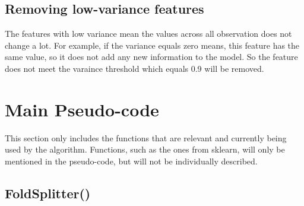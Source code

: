 \documentclass{article}
\begin{document}
\subsection{Removing low-variance features}
The features with low variance mean the values across all observation does not change a lot. For example, if the variance equals zero means, this feature has the same value, so it does not add any new information to the model.  So the feature does not meet the varaince threshold which equals 0.9    will be removed.

 \section{Main Pseudo-code}
This section only includes the functions that are relevant and currently being used by the algorithm. Functions, such as the ones from sklearn, will only be mentioned in the pseudo-code, but will not be individually described.
 \subsection{FoldSplitter()}
\end{document}
